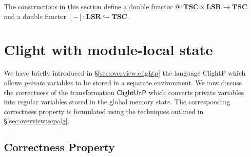 \documentclass[acmsmall,screen,review,anonymous]{acmart}
\newcommand{\kw}[1]{\ensuremath{ \mathsf{#1} }}
\begin{document}
\begin{theorem}
The constructions in this section
define a double functor
${@} : \mathbf{TSC} \times \mathbf{LSR} \rightarrow \mathbf{TSC}$
and a double functor
$[-] : \mathbf{LSR} \hookrightarrow \mathbf{TSC}$.
\end{theorem}



\section{Clight with module-local state} \label{sec:clightp} %

We have briefly introduced in \S\ref{sec:overview:clightp}
the language ClightP which allows \emph{private} variables
to be stored in a separate environment.
We now discuss the correctness of
the transformation $\kw{ClightUnP}$
which converts private variables into regular variables
stored in the global memory state.
The corresponding correctness property is
formulated using the techniques outlined in \S\ref{sec:overview:sepalg}.

\subsection{Correctness Property}
\end{document}

